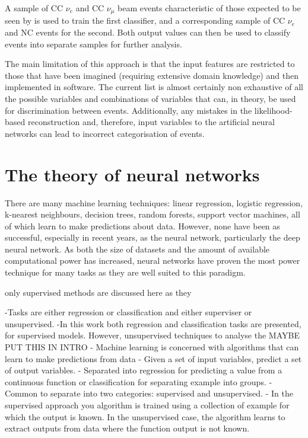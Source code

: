 A sample of CC $\nu_{e}$ and CC $\nu_{\mu}$ beam events characteristic of those expected to be
seen by \chips is used to train the first classifier, and a corresponding sample of CC $\nu_{e}$
and NC events for the second. Both output values can then be used to classify events into separate
samples for further analysis.

The main limitation of this approach is that the input features are restricted to those that have
been imagined (requiring extensive domain knowledge) and then implemented in software. The current
list is almost certainly non exhaustive of all the possible variables and combinations of
variables that can, in theory, be used for discrimination between events. Additionally, any
mistakes in the likelihood-based reconstruction and, therefore, input variables to the artificial
neural networks can lead to incorrect categorisation of events.

\section{The theory of neural networks} %
\label{sec:cvn_theory} %

There are many machine learning techniques: linear regression, logistic regression, k-nearest
neighbours, decision trees, random forests, support vector machines, all of which learn to make
predictions about data. However, none have been as successful, especially in recent years, as the
neural network, particularly the deep neural network. As both the size of datasets and the amount
of available computational power has increased, neural networks have proven the most power
technique for many tasks as they are well suited to this paradigm.

only supervised methods are discussed here as they

-Tasks are either regression or classification and either superviser or unsupervised.
-In this work both regression and classification tasks are presented, for supervised models.
However, unsupervised techniques to analyse the MAYBE PUT THIS IN INTRO
- Machine learning is concerned with algorithms that can learn to make predictions from data
- Given a set of input variables, predict a set of output variables.
- Separated into regression for predicting a value from a continuous function or classification
for separating example into groups.
- Common to separate into two categories: supervised and unsupervised.
- In the supervised approach you algorithm is trained using a collection of example for which the
output is known. In the unsupervised case, the algorithm learns to extract outputs from data where
the function output is not known.

